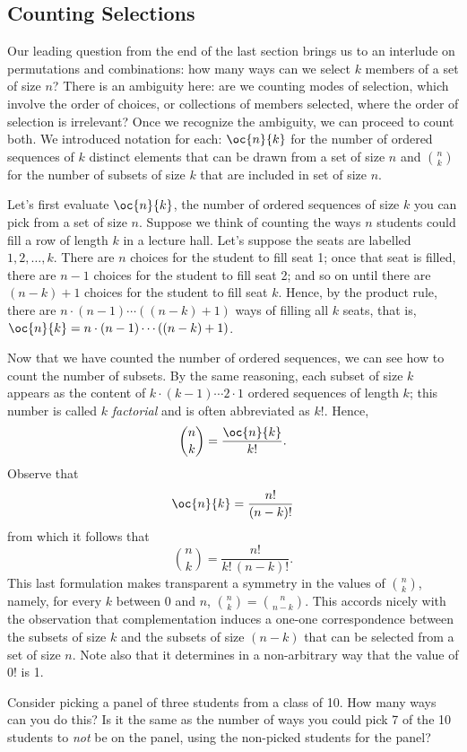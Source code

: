 \subsection{Counting Selections}
Our leading question from the end of the last section brings us to an interlude on permutations and combinations: how many ways can we select $k$ members of a set of size $n$? There is an ambiguity here: are we counting modes of selection, which involve the order of choices, or collections of members selected, where the order of selection is irrelevant? Once we recognize the ambiguity, we can proceed to count both. We introduced notation for each: $\oc{n}{k}$ for the number of ordered sequences of $k$ distinct elements that can be drawn from a set of size $n$  and $\binom{n}{k}$ for the number of subsets of size $k$ that are included in set of size $n$. 

Let's first evaluate $\oc{n}{k}$, the number of ordered sequences of size $k$ you can pick from a set of size $n$. Suppose we think of counting the ways $n$ students could fill a row of length $k$ in a lecture hall. Let's suppose the seats are labelled $1, 2, \ldots, k$. There are $n$ choices for the student to fill seat 1; once that seat is filled, there are $n-1$ choices for the student to fill seat 2; and so on until there are $(n-k)+1$ choices for the student to fill seat $k$. Hence, by the product rule, there are $n\cdot(n-1)\cdots((n-k)+1)$ ways of filling all $k$ seats, that is, $\oc{n}{k}=n\cdot(n-1)\cdots((n-k)+1)$. 

Now that we have counted the number of ordered sequences, we can see how to count the number of subsets. By the same reasoning, each subset of size $k$ appears as the content of $k\cdot(k-1)\cdots2\cdot1$ ordered sequences of length $k$; this number is called $k$ \emph{factorial} and is often abbreviated as $k!$. Hence, 
\[\binom{n}{k} = \frac{\oc{n}{k}}{k!}.\]  
Observe that 
\[\oc{n}{k}=\frac{n!}{(n-k)!}\]
from which it follows that 
\[\binom{n}{k} = \frac{n!}{k!\,(n-k)!}.\]
This last formulation makes transparent a symmetry in the values of $\binom{n}{k}$, namely, for every $k$ between $0$ and $n$, $\binom{n}{k}=\binom{n}{n-k}$. This accords nicely with the observation that complementation induces a one-one correspondence between the subsets of size $k$ and the subsets of size $(n-k)$ that can be selected from a set of size $n$. Note also that it determines in a non-arbitrary way that the value of $0!$ is 1.

\begin{aside}
    Consider picking a panel of three students from a class of 10. How many ways can you do this? Is it the same as the number of ways you could pick 7 of the 10 students to \emph{not} be on the panel, using the non-picked students for the panel?
\end{aside}

